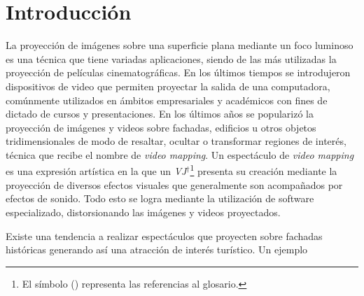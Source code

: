 ﻿\chapter{Introducción}


La proyección de imágenes sobre una superficie plana mediante un foco luminoso es una técnica que tiene variadas aplicaciones, siendo de las más utilizadas la proyección de películas cinematográficas. En los últimos tiempos se introdujeron dispositivos de video que permiten proyectar la salida de una computadora, comúnmente utilizados en ámbitos empresariales y académicos con fines de dictado de cursos y presentaciones. En los últimos años se popularizó la proyección de imágenes y videos sobre fachadas, edificios u otros objetos tridimensionales de modo de resaltar, ocultar o transformar regiones de interés, técnica que recibe el nombre de \emph{video mapping}.
Un espectáculo de \emph{video mapping} es una expresión artística en la que un \emph{VJ}$^\dagger$\footnote{El símbolo (\dag) representa las referencias al glosario.} presenta su creación mediante la proyección de diversos efectos visuales que generalmente son acompañados por efectos de sonido.
Todo esto se logra mediante la utilización de software especializado, distorsionando las imágenes y videos proyectados.




Existe una tendencia a realizar espectáculos que proyecten sobre fachadas históricas generando así una atracción de interés turístico.
Un ejemplo

